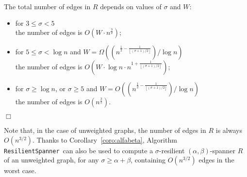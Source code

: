 \documentclass{article}
\newcommand{\qed}{\hfill \ensuremath{\Box}}
\newenvironment{proof}{\vspace{1ex}\noindent{\bf Proof.}\hspace{0.5em}}
	{\hfill\qed\vspace{2ex}}
\newcommand{\nota}[1]{\textbf{(*)}\marginpar {\tiny \raggedright{(*) #1}}}
\newcommand{\commento}[1] {}
\newcommand{\floor}[1]       {\left\lfloor #1 \right\rfloor}
\newcommand{\round}[1]       {\left( #1 \right)}
\newcommand{\ResilientSpanner}{\texttt{ResilientSpanner}}
\begin{document}
\begin{proof}
\begin{description}
\end{description}

\noindent
The total number of edges in $R$ depends on values of $\sigma$ and $W$:
\begin{itemize}
\item for $3 \leq \sigma < 5$\\
the number of edges is $O\round{W \cdot n^{\frac 3 2}}$;

\item for $5 \leq \sigma < \log n$ and $W = \Omega\round{\round{n^{\frac{1}{2} - \frac{1}{\floor{(\sigma + 1)/2}}}} / \log n}$\\
the number of edges is $O\round{W \cdot \log n \cdot n^{1 + \frac{1}{\floor{(\sigma + 1)/2}}}}$;

\item for $\sigma \geq \log n$, or $\sigma \geq 5$ and $W = O\round{\round{n^{\frac{1}{2} - \frac{1}{\floor{(\sigma + 1)/2}}}} / \log n}$\\
the number of edges is $O\round{n^{\frac 3 2}}$.

\end{itemize}
\end{proof}

\noindent
Note that, in the case of unweighted graphs, the number of edges in $R$ is always $O\round{n^{3 / 2}}$. Thanks to Corollary~\ref{coro:alfabeta}, Algorithm \ResilientSpanner\ can also be used to compute a $\sigma$-resilient $(\alpha,\beta)$-spanner $R$ of an unweighted graph, for any $\sigma \geq \alpha+\beta$, containing $O\left(n^{3/2}\right)$ edges in the worst case.

\commento{
Since\nota{questa frase si riferisce all'algo, spostare nella relativa subsection} the time required to compute all those underlying spanners is $O(mn)$, 
in all those cases the time required to build a $\sigma$-resilient spanner is $O(mn)$.
Theorem~\ref{th:shvalpreserving} can also be applied to build $\sigma$-resilient $f$-spanners, where $f$ is a general \emph{distortion} function
as defined in~\cite{PettieSchema}, provided that $\sigma \geq f(1)$. Furthermore, 
if we wish to compute a $\sigma$-resilient $t$-spanner with $\sigma < t$, the same algorithm can still be applied starting from a $\sigma$-spanner instead of an $t$-spanner, yielding the same bounds given in Theorem~\ref{th:shvalpreserving}.
}

\commento{
Our results can be extended to weighted graphs\nota{riportare la prova per i weighted},
since Theorems~\ref{th:fewhighshval} and \ref{th:smallcycles} also hold for graphs with positive edge weights.
Let $w_{max}$ and $w_{min}$ be respectively the maximum and minimum edge weight in the graph, and  let $W = \frac{w_{max}}{w_{min}}$.
For either $\sigma > \log n$ or $\sigma \geq 5$ and $W = O\round{\round{n^{\frac{1}{2} - \frac{1}{\floor{(\sigma + 1)/2}}}} / \log n}$,  we can compute
a $\sigma$-resilient $t$-spanner
with $O(n^{\frac{3}{2}})$ edges.
In the remaining cases (either  $\sigma \geq 5$ and larger $W$ or $\sigma = 3, 4$), the
total number of edges becomes $O(W \cdot n^{\frac{3}{2}})$ \nota{PGF: perch\'e questo non si accorda con la nuova prova?}. 
}
\end{document}
